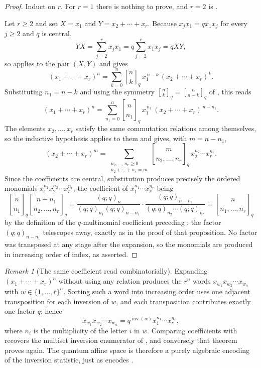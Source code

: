 \documentclass[11pt,oneside,openany]{book}
\theoremstyle{definition}
\theoremstyle{remark}
\newtheorem{remark}[remark]{Remark}
\newcommand{\qbinom}[2]{\genfrac{[}{]}{0pt}{}{#1}{#2}_{q}}
\newcommand{\qmultinom}[2]{\genfrac{[}{]}{0pt}{}{#1}{#2}_{q}}
\newcommand{\poch}[3]{(#1;#2)_{#3}}
\newcommand{\inv}{\operatorname{inv}}
\begin{document}
\begin{proof}
Induct on $r$.  For $r=1$ there is nothing to prove, and $r=2$ is .

Let $r\ge2$ and set $X=x_1$ and $Y=x_2+\cdots+x_r$.  Because $x_jx_1=qx_1x_j$ for every $j\ge2$ and $q$ is central,
\[
 YX=\sum_{j=2}^{r}x_jx_1
 =q\sum_{j=2}^{r}x_1x_j
 =qXY,
\]
so  applies to the pair $(X,Y)$ and gives
\[
 (x_1+\cdots+x_r)^n
 =\sum_{k=0}^{n}\qbinom nk\,x_1^{\,n-k}\,(x_2+\cdots+x_r)^{k}.
\]
Substituting $n_1=n-k$ and using the symmetry $\qbinom nk=\qbinom n{n-k}$ of , this reads
\[
 (x_1+\cdots+x_r)^n
 =\sum_{n_1=0}^{n}\qbinom n{n_1}\,x_1^{\,n_1}\,(x_2+\cdots+x_r)^{\,n-n_1}.
\]
The elements $x_2,\dots,x_r$ satisfy the same commutation relations among themselves, so the inductive hypothesis applies to them and gives, with $m=n-n_1$,
\[
 (x_2+\cdots+x_r)^{m}
 =\sum_{\substack{n_2,\dots,n_r\ge0\\ n_2+\cdots+n_r=m}}
 \qmultinom{m}{n_2,\dots,n_r}\,x_2^{n_2}\cdots x_r^{n_r}.
\]
Since the coefficients are central, substitution produces precisely the ordered monomials $x_1^{n_1}x_2^{n_2}\cdots x_r^{n_r}$, the coefficient of $x_1^{n_1}\cdots x_r^{n_r}$ being
\[
 \qbinom n{n_1}\qmultinom{n-n_1}{n_2,\dots,n_r}
 =\frac{\poch{q}{q}{n}}{\poch{q}{q}{n_1}\poch{q}{q}{n-n_1}}
 \cdot
 \frac{\poch{q}{q}{n-n_1}}{\poch{q}{q}{n_2}\cdots\poch{q}{q}{n_r}}
 =\qmultinom{n}{n_1,\dots,n_r}
\]
by the definition of the $q$-multinomial coefficient preceding ; the factor $\poch{q}{q}{n-n_1}$ telescopes away, exactly as in the proof of that proposition.  No factor was transposed at any stage after the expansion, so the monomials are produced in increasing order of index, as asserted.
\end{proof}

\begin{remark}[The same coefficient read combinatorially]\label{rem:quantum-multinomial-inversions}
Expanding $(x_1+\cdots+x_r)^n$ without using any relation produces the $r^n$ words $x_{w_1}x_{w_2}\cdots x_{w_n}$ with $w\in\{1,\dots,r\}^n$.  Sorting such a word into increasing order uses one adjacent transposition for each inversion of $w$, and each transposition contributes exactly one factor $q$; hence
\[
 x_{w_1}x_{w_2}\cdots x_{w_n}=q^{\inv(w)}x_1^{n_1}\cdots x_r^{n_r},
\]
where $n_i$ is the multiplicity of the letter $i$ in $w$.  Comparing coefficients with  recovers the multiset inversion enumerator of , and conversely that theorem proves  again.  The quantum affine space is therefore a purely algebraic encoding of the inversion statistic, just as  encodes .
\end{remark}
\end{document}
